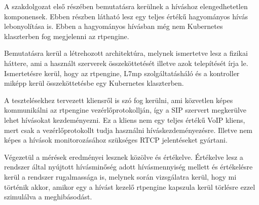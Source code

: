 A szakdolgozat első részében bemutatásra kerülnek a híváshoz elengedhetetlen komponensek. Ebben részben látható lesz egy teljes értékű hagyományos hívás lebonyolítása is. Ebben a hagyományos hívásban még nem Kubernetes klaszterben fog megjelenni az rtpengine. 

Bemutatásra kerül a létrehozott architektúra, melynek ismertetve lesz a fizikai háttere, ami a használt szerverek összeköttetését illetve azok telepítését írja le. Ismertetésre 
kerül, hogy az rtpengine, L7mp szolgáltatásháló és a kontroller miképp kerül összeköttetésbe egy Kubernetes klaszterben. 

A tesztelésekhez tervezett kliensről is szó fog kerülni, ami közvetlen képes kommunikálni az rtpengine vezérlőprotokollján, így a SIP szervert megkerülve lehet hívásokat kezdeményezni. Ez a kliens nem egy teljes értékű VoIP kliens, mert csak a vezérlőprotokollt tudja használni híváskezdeményezésre. Illetve nem képes a hívások monitorozásához szükséges RTCP jelentéseket gyártani. 

Végezetül a mérések eredményei lesznek közölve és értékelve. Értékelve lesz a rendszer által nyújtott hívásminőség adott hívásmennyiség mellett és értékelésre kerül a rendszer rugalmassága is, melynek során vizsgálatra kerül, hogy mi történik akkor, amikor egy a hívást kezelő rtpengine kapszula kerül törlésre ezzel szimulálva a meghibásodást.   